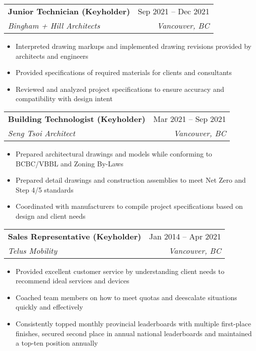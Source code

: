 \documentclass[letterpaper,11pt]{article}
\makeatletter
\newcommand{\resumeItem}[1]{
  \item\small{
    {#1 \vspace{-2pt}}
  }
}
\newcommand{\resumeSubheading}[4]{
  \vspace{-2pt}\item
    \begin{tabular*}{0.97\textwidth}[t]{l@{\extracolsep{\fill}}r}
      \textbf{#1} & #2 \\
      \textit{\small#3} & \textit{\small #4} \\
    \end{tabular*}\vspace{-7pt}
}
\newcommand{\resumeSubSubheading}[2]{
    \item
    \begin{tabular*}{0.97\textwidth}{l@{\extracolsep{\fill}}r}
      \textit{\small#1} & \textit{\small #2} \\
    \end{tabular*}\vspace{-7pt}
}
\newcommand{\resumeSubHeadingListEnd}{\end{itemize}}
\newcommand{\resumeItemListStart}{\begin{itemize}}
\newcommand{\resumeItemListEnd}{\end{itemize}\vspace{-5pt}}
\makeatother
\begin{document}
    \resumeSubheading
	  {Junior Technician (Keyholder)}{Sep 2021 -- Dec 2021}
	  {Bingham + Hill Architects}{Vancouver, BC}
      \resumeItemListStart
        \resumeItem{Interpreted drawing markups and implemented drawing revisions provided by architects and engineers}
        \resumeItem{Provided specifications of required materials for clients and consultants}
        \resumeItem{Reviewed and analyzed project specifications to ensure accuracy and compatibility with design intent}
	\resumeItemListEnd
      

    \resumeSubheading
	  {Building Technologist (Keyholder)}{Mar 2021 -- Sep 2021}
	  {Seng Tsoi Architect}{Vancouver, BC}
      \resumeItemListStart
        \resumeItem{Prepared architectural drawings and models while conforming to BCBC/VBBL and Zoning By-Laws}
        \resumeItem{Prepared detail drawings and construction assemblies to meet Net Zero and Step 4/5 standards}
        \resumeItem{Coordinated with manufacturers to compile project specifications based on design and client needs}
    \resumeItemListEnd

    \resumeSubheading
	  {Sales Representative (Keyholder)}{Jan 2014 -- Apr 2021}
	  {Telus Mobility}{Vancouver, BC}
      \resumeItemListStart
        \resumeItem{Provided excellent customer service by understanding client needs to recommend ideal services and devices}
        \resumeItem{Coached team members on how to meet quotas and deescalate situations quickly and effectively}
        \resumeItem{Consistently topped monthly provincial leaderboards with multiple first-place finishes, secured second place in annual national leaderboards and maintained a top-ten position annually}
	\resumeItemListEnd

\end{document}
